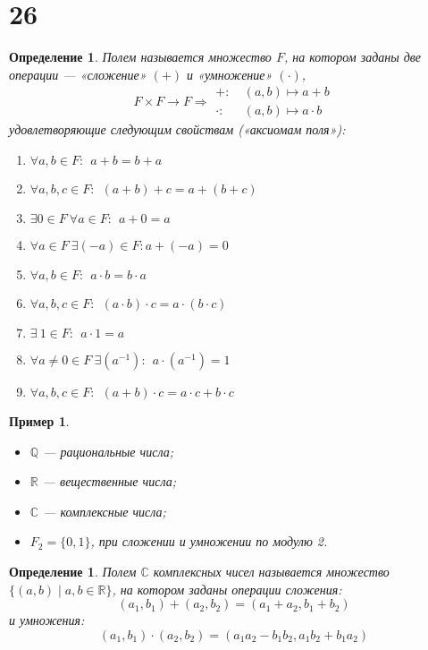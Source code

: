 \documentclass[a4paper,12pt]{article}
\newtheorem*{definition}{Определение}
\newtheorem*{Def}{Определение}
\newtheorem*{Examples}{Пример}
\begin{document}
	\section*{26}
	\begin{definition}
		Полем называется множество $F$, на котором заданы две операции —  «сложение» $(+)$ и «умножение» $(\cdot)$,
		\[
		F \times F \rightarrow F \Rightarrow
		\begin{aligned}
		+\!:\:& (a, b) \mapsto a + b \\
		\cdot:\:& (a, b) \mapsto a \cdot b
		\end{aligned}
		\]
		удовлетворяющие следующим свойствам («аксиомам поля»):
		\
		\begin{enumerate}
			\item $\forall a, b \in F: \ \ a + b = b + a$
			\item $\forall a, b, c \in F: \ \ (a + b) + c = a + (b + c)$
			\item $\exists 0 \in F \ \forall a \in F: \ \ a + 0 = a$ 
			\item $\forall a \in F \ \exists (-a) \in F: a + (-a) = 0$
			\item $\forall a, b \in F: \ \ a \cdot b = b \cdot a$
			\item $\forall a, b, c \in F: \ \ (a \cdot b) \cdot c = a \cdot (b \cdot c)$
			\item $\exists \ 1 \in F: \ \ a \cdot 1 = a$
			\item $\forall a \ne 0 \in F \  \exists (a ^ {-1}): \ \ a \cdot (a^{-1}) = 1$
			\item $\forall a, b, c \in F: \ \ (a + b) \cdot c = a \cdot c + b \cdot c$
		\end{enumerate}
	\end{definition}

	\begin{Examples} \ 
		\begin{itemize}
			\item $\mathbb{Q}$ — рациональные числа; 
			\item $\mathbb{R}$ — вещественные числа;
			\item $\mathbb{C}$ — комплексные числа;
			\item $F_2 = \{0, 1\}$, при сложении и умножении по модулю 2.
		\end{itemize}
	\end{Examples}

		\begin{Def}
		Полем $\mathbb{C}$ комплексных чисел называется множество $\{(a, b) \mid a, b \in \mathbb{R}\}$, на котором заданы операции сложения: $$(a_1, b_1) + (a_2, b_2) = (a_1 + a_2, b_1 + b_2)$$ и умножения: $$(a_1, b_1) \cdot (a_2, b_2) = (a_1a_2 - b_1b_2, a_1b_2 + b_1a_2)$$
	\end{Def}
	
\end{document}
